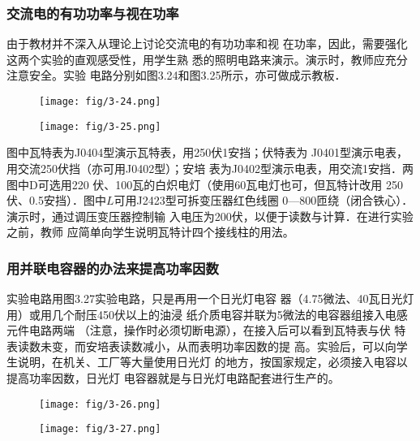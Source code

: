 \subsubsection{交流电的有功功率与视在功率}
由于教材并不深入从理论上讨论交流电的有功功率和视
在功率，因此，需要强化这两个实验的直观感受性，用学生熟
悉的照明电路来演示。演示时，教师应充分注意安全。实验
电路分别如图3.24和图3.25所示，亦可做成示教板．
\begin{figure}[htp]
    \centering
\texttt{[image: fig/3-24.png]}
    \caption{}
\end{figure}

\begin{figure}[htp]
    \centering
\texttt{[image: fig/3-25.png]}
    \caption{}
\end{figure}

图中瓦特表为J0404型演示瓦特表，用250伏1安挡；伏特表为
J0401型演示电表，用交流250伏挡（亦可用J0402型）；安培
表为J0402型演示电表，用交流1安挡．两图中D可选用220
伏、100瓦的白炽电灯（使用60瓦电灯也可，但瓦特计改用
250伏、0.5安挡）．图中$L$可用J2423型可拆变压器红色线圈
0—800匝绕（闭合铁心）．演示时，通过调压变压器控制输
入电压为200伏，以便于读数与计算．在进行实验之前，教师
应简单向学生说明瓦特计四个接线柱的用法。

\subsubsection{用并联电容器的办法来提高功率因数}
实验电路用图3.27实验电路，只是再用一个日光灯电容
器（4.75微法、40瓦日光灯用）或用几个耐压450伏以上的油浸
纸介质电容并联为5微法的电容器组接入电感元件电路两端
（注意，操作时必须切断电源），在接入后可以看到瓦特表与伏
特表读数未变，而安培表读数减小，从而表明功率因数的提
高。实验后，可以向学生说明，在机关、工厂等大量使用日光灯
的地方，按国家规定，必须接入电容以提高功率因数，日光灯
电容器就是与日光灯电路配套进行生产的。
\begin{figure}[htp]\centering
    \begin{minipage}[t]{0.48\textwidth}
    \centering
\texttt{[image: fig/3-26.png]}
    \caption{}
    \end{minipage}
    \begin{minipage}[t]{0.48\textwidth}
    \centering
\texttt{[image: fig/3-27.png]}
    \caption{}
    \end{minipage}
    \end{figure}

